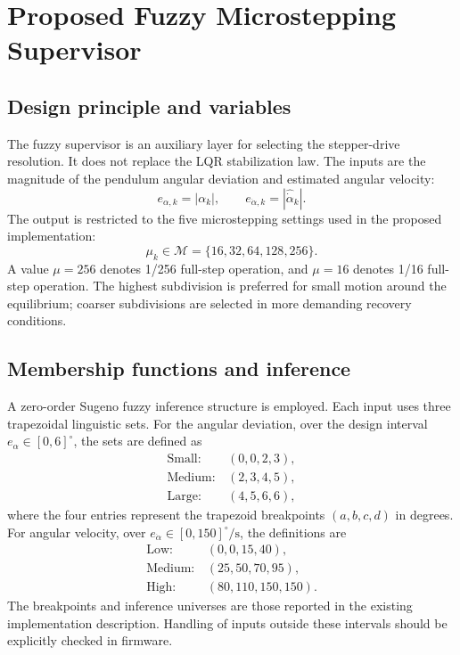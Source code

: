 \documentclass[conference]{IEEEtran}
\begin{document}
\section{Proposed Fuzzy Microstepping Supervisor}
\subsection{Design principle and variables}
The fuzzy supervisor is an auxiliary layer for selecting the stepper-drive resolution. It does not replace the LQR stabilization law. The inputs are the magnitude of the pendulum angular deviation and estimated angular velocity:
\begin{equation}
 e_{\alpha,k}=|\alpha_k|,\qquad e_{\dot\alpha,k}=|\hat{\dot\alpha}_k|.
 \label{eq:inputs}
\end{equation}
The output is restricted to the five microstepping settings used in the proposed implementation:
\begin{equation}
 \mu_k\in\mathcal M=\{16,32,64,128,256\}.
 \label{eq:modes}
\end{equation}
A value $\mu=256$ denotes 1/256 full-step operation, and $\mu=16$ denotes 1/16 full-step operation. The highest subdivision is preferred for small motion around the equilibrium; coarser subdivisions are selected in more demanding recovery conditions.

\subsection{Membership functions and inference}
A zero-order Sugeno fuzzy inference structure is employed. Each input uses three trapezoidal linguistic sets. For the angular deviation, over the design interval $e_\alpha\in[0,6]^\circ$, the sets are defined as
\begin{align}
 \mathrm{Small}:&(0,0,2,3),\nonumber\\
 \mathrm{Medium}:&(2,3,4,5),\\
 \mathrm{Large}:&(4,5,6,6),\nonumber
\end{align}
where the four entries represent the trapezoid breakpoints $(a,b,c,d)$ in degrees. For angular velocity, over $e_{\dot\alpha}\in[0,150]^\circ/\mathrm{s}$, the definitions are
\begin{align}
 \mathrm{Low}:&(0,0,15,40),\nonumber\\
 \mathrm{Medium}:&(25,50,70,95),\\
 \mathrm{High}:&(80,110,150,150).\nonumber
\end{align}
The breakpoints and inference universes are those reported in the existing implementation description. Handling of inputs outside these intervals should be explicitly checked in firmware.
\end{document}
